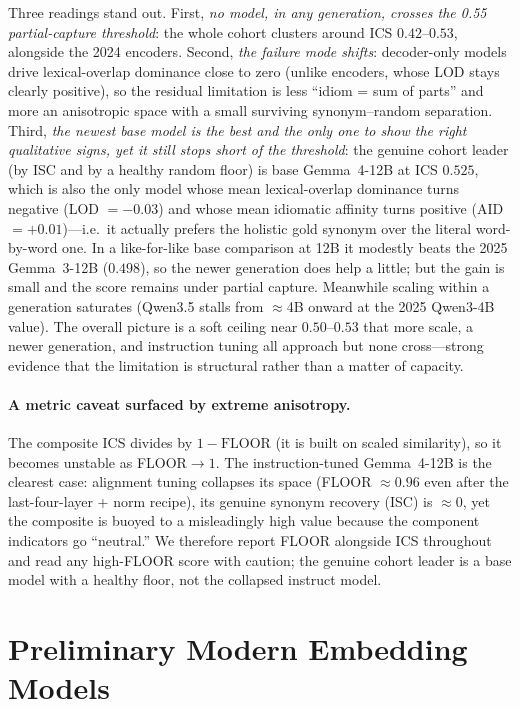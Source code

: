 \documentclass[11pt]{article}
\begin{document}
Three readings stand out. First, \emph{no model, in any generation, crosses the 0.55
partial-capture threshold}: the whole cohort clusters around ICS $0.42$--$0.53$, alongside the 2024
encoders. Second, \emph{the failure mode shifts}: decoder-only models drive lexical-overlap
dominance close to zero (unlike encoders, whose LOD stays clearly positive), so the residual
limitation is less ``idiom = sum of parts'' and more an anisotropic space with a small surviving
synonym--random separation. Third, \emph{the newest base model is the best and the only one to show
the right qualitative signs, yet it still stops short of the threshold}: the genuine cohort leader
(by ISC and by a healthy random floor) is base Gemma~4-12B at ICS $0.525$, which is also the only
model whose mean lexical-overlap dominance turns negative (LOD $=-0.03$) and whose mean idiomatic
affinity turns positive (AID $=+0.01$)---i.e.\ it actually prefers the holistic gold synonym over
the literal word-by-word one. In a like-for-like base comparison at 12B it modestly beats the 2025
Gemma~3-12B ($0.498$), so the newer generation does help a little; but the gain is small and the
score remains under partial capture. Meanwhile scaling within a generation saturates (Qwen3.5 stalls
from $\approx$4B onward at the 2025 Qwen3-4B value). The overall picture is a soft ceiling near
$0.50$--$0.53$ that more scale, a newer generation, and instruction tuning all approach but none
cross---strong evidence that the limitation is structural rather than a matter of capacity.

\paragraph{A metric caveat surfaced by extreme anisotropy.} The composite ICS divides by
$1-\text{FLOOR}$ (it is built on scaled similarity), so it becomes unstable as FLOOR$\to1$. The
instruction-tuned Gemma~4-12B is the clearest case: alignment tuning collapses its space (FLOOR
$\approx0.96$ even after the last-four-layer + norm recipe), its genuine synonym recovery (ISC) is
$\approx0$, yet the composite is buoyed to a misleadingly high value because the component
indicators go ``neutral.'' We therefore report FLOOR alongside ICS throughout and read any
high-FLOOR score with caution; the genuine cohort leader is a base model with a healthy floor, not
the collapsed instruct model.

\section{Preliminary Modern Embedding Models}
\end{document}
